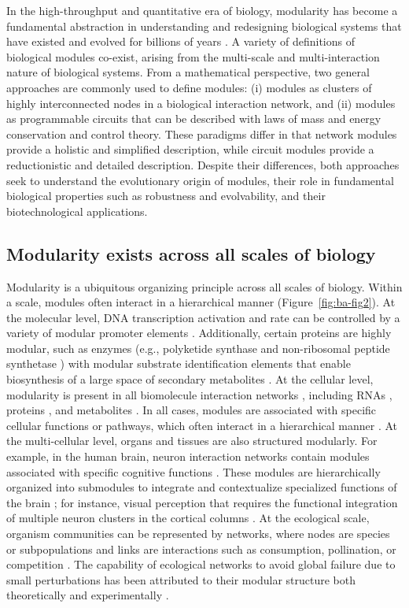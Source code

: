 In the high-throughput and quantitative era of biology, modularity has become a fundamental abstraction in understanding and redesigning biological systems that have existed and evolved for billions of years \citep{hartwell1999, wagner2007}.
A variety of definitions of biological modules co-exist, arising from the multi-scale and multi-interaction nature of biological systems.
From a mathematical perspective, two general approaches are commonly used to define modules: (i) modules as clusters of highly interconnected nodes in a biological interaction network, and (ii) modules as programmable circuits that can be described with laws of mass and energy conservation and control theory.
These paradigms differ in that network modules provide a holistic and simplified description, while circuit modules provide a reductionistic and detailed description.
Despite their differences, both approaches seek to understand the evolutionary origin of modules, their role in fundamental biological properties such as robustness and evolvability, and their biotechnological applications.

\subsection{Modularity exists across all scales of biology}

Modularity is a ubiquitous organizing principle across all scales of biology.
Within a scale, modules often interact in a hierarchical manner (Figure~\ref{fig:ba-fig2}).
At the molecular level, DNA transcription activation and rate can be controlled by a variety of modular promoter elements \citep{dynan1989}.
Additionally, certain proteins are highly modular, such as enzymes (e.g., polyketide synthase and non-ribosomal peptide synthetase \citep{hutchinson2003}) with modular substrate identification elements that enable biosynthesis of a large space of secondary metabolites \citep{khosla2001}.
At the cellular level, modularity is present in all biomolecule interaction networks \citep{mitra2013}, including RNAs \citep{stuart2003}, proteins \citep{spirin2003}, and metabolites \citep{ravasz2002}.
In all cases, modules are associated with specific cellular functions or pathways, which often interact in a hierarchical manner \citep{ravasz2002}.
At the multi-cellular level, organs and tissues are also structured modularly.
For example, in the human brain, neuron interaction networks contain modules associated with specific cognitive functions \citep{sporns2016}.
These modules are hierarchically organized into submodules to integrate and contextualize specialized functions of the brain \citep{meunier2010}; for instance, visual perception that requires the functional integration of multiple neuron clusters in the cortical columns \citep{park2013}.
At the ecological scale, organism communities can be represented by networks, where nodes are species or subpopulations and links are interactions such as consumption, pollination, or competition \citep{grilli2016}.
The capability of ecological networks to avoid global failure due to small perturbations has been attributed to their modular structure both theoretically \citep{grilli2016} and experimentally \citep{gilarranz2017}.

